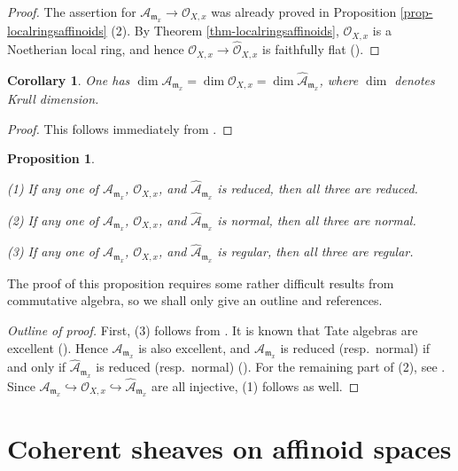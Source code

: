 \documentclass[a4paper,12pt, dvipdfmx]{jsbook}
\def\O{\mathscr{O}}
\def\m{\mathfrak{m}}
\theoremstyle{plain}
\newtheorem{prop}[thm]{\bfseries Proposition}
\newtheorem{cor}[thm]{\bfseries Corollary}
\theoremstyle{definition}
\begin{document}
\begin{proof}[Proof]
The assertion for $\mathcal{A}_{\m_x}\rightarrow\O_{X,x}$ was already proved in Proposition \ref{prop-localringsaffinoids} (2).
By Theorem \ref{thm-localringsaffinoids}, $\O_{X,x}$ is a Noetherian local ring, and hence $\O_{X,x}\rightarrow\widehat{\O}_{X,x}$ is faithfully flat (\cite[Chap.\ 10, Exercise 7]{AM}).
\end{proof}

\begin{cor}\label{cor-localringsaffinoids2}{\rm 
One has $\dim\mathcal{A}_{\m_x}=\dim\O_{X,x}=\dim\widehat{\mathcal{A}}_{\m_x}$, where $\dim$ denotes Krull dimension.}
\end{cor}

\begin{proof}[Proof]
This follows immediately from \cite[Cor.\ 11.19]{AM}.
\end{proof}

\begin{prop}\label{prop-localringsaffinoids3}{\rm 
(1) If any one of $\mathcal{A}_{\m_x}$, $\O_{X,x}$, and $\widehat{\mathcal{A}}_{\m_x}$ is reduced, then all three are reduced.

(2) If any one of $\mathcal{A}_{\m_x}$, $\O_{X,x}$, and $\widehat{\mathcal{A}}_{\m_x}$ is normal, then all three are normal.

(3) If any one of $\mathcal{A}_{\m_x}$, $\O_{X,x}$, and $\widehat{\mathcal{A}}_{\m_x}$ is regular, then all three are regular.}
\end{prop}

The proof of this proposition requires some rather difficult results from commutative algebra, so we shall only give an outline and references.
\begin{proof}[Outline of proof]
First, (3) follows from \cite[Prop.\ 11.24]{AM}.
It is known that Tate algebras are excellent (\cite{Kieh2}).
Hence $\mathcal{A}_{\m_x}$ is also excellent, and $\mathcal{A}_{\m_x}$ is reduced (resp.\ normal) if and only if $\widehat{\mathcal{A}}_{\m_x}$ is reduced (resp.\ normal) (\cite[$\mathbf{IV}$, (7.8.3) (v)]{EGA}).
For the remaining part of (2), see \cite{Kieh0}.
Since $\mathcal{A}_{\m_x}\hookrightarrow\O_{X,x}\hookrightarrow\widehat{\mathcal{A}}_{\m_x}$ are all injective, (1) follows as well.
\end{proof}
\section{Coherent sheaves on affinoid spaces}\label{sec-coherentsheafaffinoids}
\end{document}
